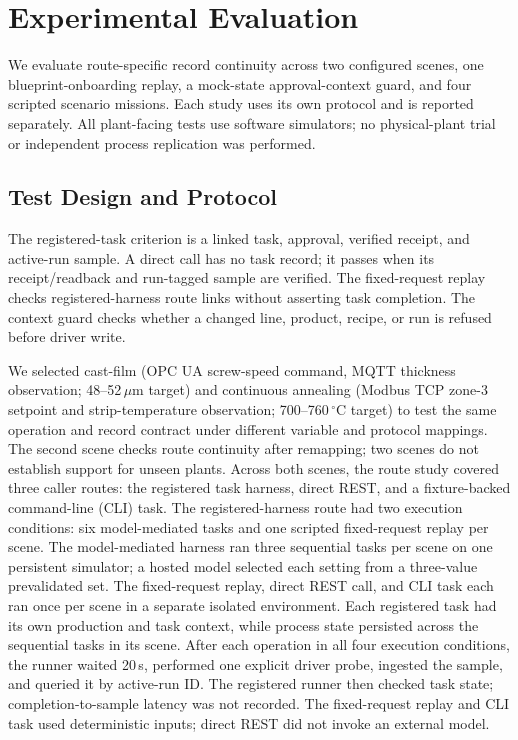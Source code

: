 \section{Experimental Evaluation}
\label{sec:eval}
We evaluate route-specific record continuity across two configured scenes, one
blueprint-onboarding replay, a mock-state approval-context guard, and four
scripted scenario missions. Each study uses its own protocol and is reported
separately. All plant-facing tests use software simulators; no physical-plant
trial or independent process replication was performed.

\subsection{Test Design and Protocol}
\label{sec:eval-protocol}
The registered-task criterion is a linked task, approval, verified receipt,
and active-run sample. A direct call has no task record; it passes when its
receipt/readback and run-tagged sample are verified. The fixed-request replay
checks registered-harness route links without asserting task completion. The
context guard checks whether a changed line, product, recipe, or run is
refused before driver write.

We selected cast-film (OPC UA screw-speed command, MQTT thickness observation;
48--52\,$\mu$m target) and continuous annealing (Modbus TCP zone-3 setpoint
and strip-temperature observation; 700--760\,$^{\circ}$C target) to test the
same operation and record contract under different variable and protocol
mappings. The second scene checks route continuity after remapping; two scenes
do not establish support for unseen plants.
Across both scenes, the route study covered three caller routes: the
registered task harness, direct REST, and a fixture-backed command-line (CLI)
task. The registered-harness route had two execution conditions: six
model-mediated tasks and one scripted fixed-request replay per scene. The
model-mediated harness ran three sequential tasks per scene on one persistent
simulator; a hosted model selected each setting from a three-value
prevalidated set. The fixed-request replay, direct REST call, and CLI task
each ran once per scene in a separate isolated environment.
Each registered task had its own production and task context, while process
state persisted across the sequential tasks in its scene. After each operation
in all four execution conditions, the runner waited 20\,s, performed one explicit driver
probe, ingested the sample, and queried it by active-run ID. The registered
runner then checked task state; completion-to-sample latency was not recorded.
The fixed-request replay and CLI task used deterministic inputs; direct REST
did not invoke an external model.

